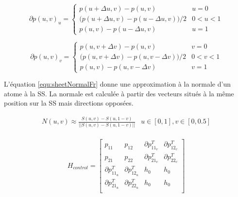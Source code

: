 \begin{equation}
 \partial p(u, v)_u = \left \{ \begin{array}{ll}
                      p(u + \Delta u, v) - p(u , v) & u = 0\\
                      \big (p(u + \Delta u, v) - p(u - \Delta u, v)\big )/2 & 0 < u < 1 \\
                      p(u, v) - p(u - \Delta u, v) & u = 1
                     \end{array} \right .
\label{equ:pDerivativeUFr}
\end{equation}

\begin{equation}
 \partial p(u, v)_v = \left \{ \begin{array}{ll}
                      p(u, v + \Delta v) - p(u, v) & v = 0\\
                      \big (p(u, v + \Delta v) - p(u, v - \Delta v) \big ) /2 & 0 < v < 1 \\
                      p(u, v) - p(u, v - \Delta v) & v = 1
                     \end{array} \right .
\label{equ:pDerivativeVFr}
\end{equation}

L'équation \ref{equ:sheetNormalFr} donne une approximation à la normale d'un atome à la SS.
La normale est calculée à partir des vecteurs situés à la même position sur la SS mais directions opposées.

\begin{equation}
  \begin{array}{cc}
   N(u, v) \approx \frac{S(u, v) - S(u, 1 - v)}{||S(u, v) - S(u, 1 - v)||}  & u  \in [0, 1], v \in [0, 0.5] \\
  \end{array}
\label{equ:sheetNormalFr}
\end{equation}

\begin{equation}
 H_{control} = \left [ \begin{array}{cccc}
                    p_{11} & p_{12} 			& \partial p_{{11}_v}^T & \partial p_{{12}_v}^T \\
                    p_{21} & p_{22}			& \partial p_{{21}_v}^T & \partial p_{{22}_v}^T \\
                    \partial p_{{11}_u}^T & \partial p_{{12}_u}^T	& h_{0} & h_{0} \\
                    \partial p_{{21}_u}^T & \partial p_{{22}_u}^T	& h_{0} & h_{0} \\
                    
                   \end{array} \right ]
  \label{equ:hermiteControlFr}
\end{equation}

